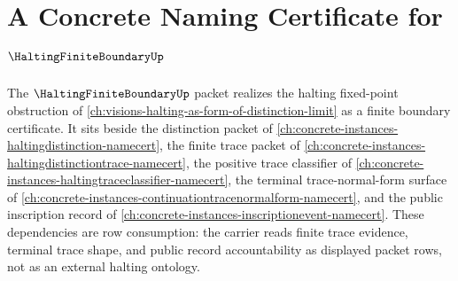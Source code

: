 \chapter{A Concrete Naming Certificate for $\HaltingFiniteBoundaryUp$}
\label{ch:concrete-instances-halting-finite-boundary-namecert}

The $\HaltingFiniteBoundaryUp$ packet realizes the halting fixed-point obstruction of \autoref{ch:visions-halting-as-form-of-distinction-limit} as a finite boundary certificate. It sits beside the distinction packet of \autoref{ch:concrete-instances-haltingdistinction-namecert}, the finite trace packet of \autoref{ch:concrete-instances-haltingdistinctiontrace-namecert}, the positive trace classifier of \autoref{ch:concrete-instances-haltingtraceclassifier-namecert}, the terminal trace-normal-form surface of \autoref{ch:concrete-instances-continuationtracenormalform-namecert}, and the public inscription record of \autoref{ch:concrete-instances-inscriptionevent-namecert}. These dependencies are row consumption: the carrier reads finite trace evidence, terminal trace shape, and public record accountability as displayed packet rows, not as an external halting ontology.

